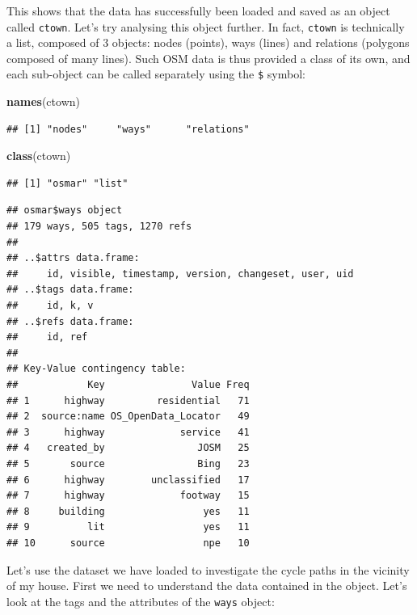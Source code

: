 \documentclass[]{article}
\newenvironment{Shaded}{}{}
\newcommand{\KeywordTok}[1]{\textcolor[rgb]{0.00,0.44,0.13}{\textbf{{#1}}}}
\newcommand{\NormalTok}[1]{{#1}}
\begin{document}
This shows that the data has successfully been loaded and saved as an
object called \texttt{ctown}. Let's try analysing this object further.
In fact, \texttt{ctown} is technically a list, composed of 3 objects:
nodes (points), ways (lines) and relations (polygons composed of many
lines). Such OSM data is thus provided a class of its own, and each
sub-object can be called separately using the \texttt{\$} symbol:

\begin{Shaded}
\begin{Highlighting}[]
\KeywordTok{names}\NormalTok{(ctown)}
\end{Highlighting}
\end{Shaded}
\begin{verbatim}
## [1] "nodes"     "ways"      "relations"
\end{verbatim}
\begin{Shaded}
\begin{Highlighting}[]
\KeywordTok{class}\NormalTok{(ctown)}
\end{Highlighting}
\end{Shaded}
\begin{verbatim}
## [1] "osmar" "list"
\end{verbatim}
\begin{Shaded}
\end{Shaded}
\begin{verbatim}
## osmar$ways object
## 179 ways, 505 tags, 1270 refs 
## 
## ..$attrs data.frame: 
##     id, visible, timestamp, version, changeset, user, uid 
## ..$tags data.frame: 
##     id, k, v 
## ..$refs data.frame: 
##     id, ref 
##  
## Key-Value contingency table:
##            Key               Value Freq
## 1      highway         residential   71
## 2  source:name OS_OpenData_Locator   49
## 3      highway             service   41
## 4   created_by                JOSM   25
## 5       source                Bing   23
## 6      highway        unclassified   17
## 7      highway             footway   15
## 8     building                 yes   11
## 9          lit                 yes   11
## 10      source                 npe   10
\end{verbatim}
Let's use the dataset we have loaded to investigate the cycle paths in
the vicinity of my house. First we need to understand the data contained
in the object. Let's look at the tags and the attributes of the
\texttt{ways} object:
\end{document}
